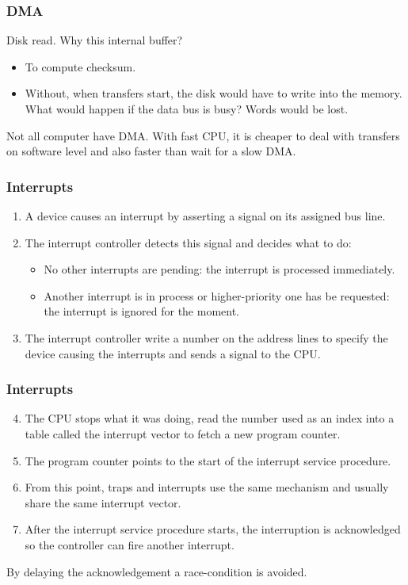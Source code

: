 \begin{frame}
  \frametitle{DMA}
  \begin{block}{Disk read. Why this internal buffer?}
    \begin{itemize}
      \item To compute checksum.
      \item Without, when transfers start, the disk would have to write into the memory. What would happen if the data bus is busy? Words would be lost.
    \end{itemize}
  \end{block}
  Not all computer have DMA. With fast CPU, it is cheaper to deal with transfers on software level and also faster than wait for a slow DMA.
\end{frame}

\begin{frame}
  \frametitle{Interrupts}
  \begin{enumerate}
    \item A device causes an interrupt by asserting a signal on its assigned bus line.
    \item The interrupt controller detects this signal and decides what to do:
    \begin{itemize}
      \item No other interrupts are pending: the interrupt is processed immediately.
      \item Another interrupt is in process or higher-priority one has be requested: the interrupt is ignored for the moment.
    \end{itemize}
      \item The interrupt controller write a number on the address lines to specify the device causing the interrupts and sends a signal to the CPU.
  \end{enumerate}
\end{frame}

\begin{frame}
  \frametitle{Interrupts}
  \begin{enumerate}\setcounter{enumi}{3}
    \item The CPU stops what it was doing, read the number used as an index into a table called the interrupt vector to fetch a new program counter.
    \item The program counter points to the start of the interrupt service procedure.
    \item From this point, traps and interrupts use the same mechanism and usually share the same interrupt vector.
    \item After the interrupt service procedure starts, the interruption is acknowledged so the controller can fire another interrupt.
  \end{enumerate}
  By delaying the acknowledgement a race-condition is avoided.
\end{frame}

